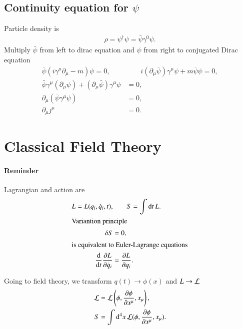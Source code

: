 \subsection{Continuity equation for $\psi$}
Particle density is 
\begin{align}
   \rho = \psi^\dagger \psi = \bar{\psi} \gamma^0 \psi.
\end{align}
Multiply $\bar{\psi}$ from left to dirac equation and $\psi$ from right to conjugated Dirac equation
\begin{align*}
   \bar{\psi} \left( i \gamma^\mu \partial_\mu - m \right) \psi = 0, &\qquad i (\partial_\mu \bar{\psi}) \gamma^\mu \psi + m \bar{\psi} \psi = 0, \\
   \bar\psi \gamma^\mu (\partial_\mu \psi) + (\partial_\mu \bar\psi) \gamma^\mu \psi &= 0, \\
   \partial_\mu ( \bar{\psi} \gamma^\mu \psi) &= 0, \\
   \partial_\mu j^\mu &= 0.
\end{align*}

\section{Classical Field Theory} 
\paragraph{Reminder} 
Lagrangian and action are
\begin{align*}
   L = L (q_i, \dot{q}_i, t), &\qquad   S = \int \dd{t} L. \\
   \shortintertext{Variantion principle}
   \delta S &= 0, \\
   \shortintertext{is equivalent to Euler-Lagrange equations}
   \frac{\dd}{\dd{t}} \frac{\partial L}{ \partial \dot{q}_i}& =\frac{\partial L}{\partial q_i}.
\end{align*} 

Going to field theory, we transform $q(t) \rightarrow \phi(x)$ and $L \rightarrow \mathcal{L}$
\begin{align*}
   \mathcal{L} &= \mathcal{L} \left(\phi, \frac{\partial \phi}{\partial x^\mu}, x_\mu \right), \\
   S &= \int \dd[4]{x} \mathcal{L}(\phi, \frac{\partial \phi}{\partial x^\mu}, x_\mu).
\end{align*}

